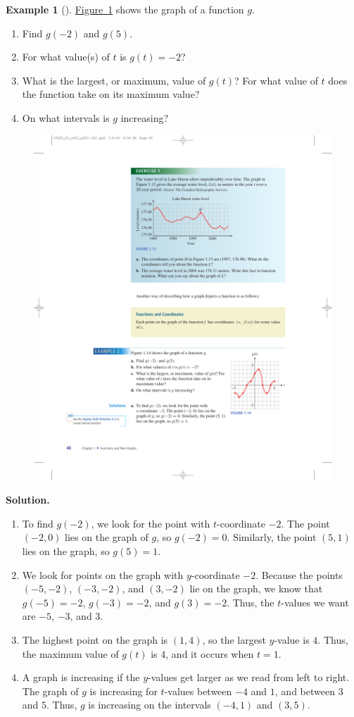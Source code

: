 \documentclass[10pt,]{book}
\theoremstyle{plain}
\theoremstyle{definition}
\theoremstyle{definition}
\newtheorem{example}[theorem]{Example}
\theoremstyle{definition}
\theoremstyle{definition}
\numberwithin{equation}{part}
\begin{document}
\begin{example}[]\label{example-function-graph}
\hyperref[fig-function]{Figure~\ref{fig-function}} shows the graph of a function \(g\). \leavevmode%
\begin{enumerate}[label=*\alph**]
\item\hypertarget{li-605}{}Find \(g(-2)\) and \(g(5)\).%
\item\hypertarget{li-606}{}For what value(s) of \(t\) is \(g(t) = -2\)?%
\item\hypertarget{li-607}{}What is the largest, or maximum, value of \(g(t)\)? For what value of \(t\) does the function take on its maximum value?%
\item\hypertarget{li-608}{}On what intervals is \(g\) increasing?%
\end{enumerate}
%
\begin{figure}
\centering
\includegraphics[width=0.6\linewidth]{images/fig-function}
\caption{\label{fig-function}}
\end{figure}
\par\medskip\noindent%
\textbf{Solution.}\quad \leavevmode%
\begin{enumerate}[label=*\alph**]
\item\hypertarget{li-609}{}To find \(g(-2)\), we look for the point with \(t\)-coordinate \(-2\). The point \((-2, 0)\) lies on the graph of \(g\), so \(g(-2) = 0\). Similarly, the point \((5, 1)\) lies on the graph, so \(g(5) = 1\).%
\item\hypertarget{li-610}{}We look for points on the graph with \(y\)-coordinate \(-2\). Because the points \((-5, -2)\), \((-3, -2)\), and \((3, -2)\) lie on the graph, we know that \(g(-5) = -2\), \(g(-3) = -2\), and \(g(3) = -2\). Thus, the \(t\)-values we want are \(-5\), \(-3\), and \(3\).%
\item\hypertarget{li-611}{}The highest point on the graph is \((1, 4)\), so the largest \(y\)-value is \(4\). Thus, the maximum value of \(g(t)\) is \(4\), and it occurs when \(t = 1\).%
\item\hypertarget{li-612}{}A graph is increasing if the \(y\)-values get larger as we read from left to right. The graph of \(g\) is increasing for \(t\)-values between \(-4\) and \(1\), and between \(3\) and \(5\). Thus, \(g\) is increasing on the intervals \((-4, 1)\) and \((3, 5)\).%
\end{enumerate}
\end{example}
\end{document}
